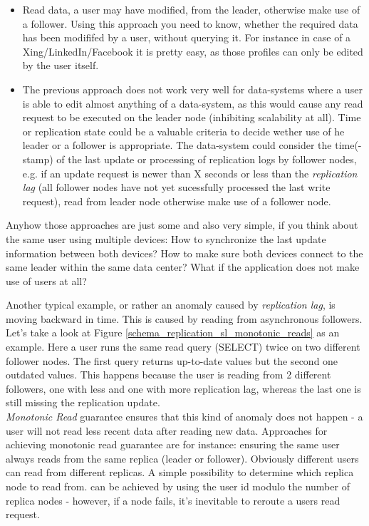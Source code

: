 {\begin{samepage}
\begin{itemize}
\item Read data, a user may have modified, from the leader, otherwise make use of a follower. Using this approach you need to know, whether the required data has been modififed by a user, without querying it. For instance in case of a Xing/LinkedIn/Facebook it is pretty easy, as those profiles can only be edited by the user itself.
\item The previous approach does not work very well for data-systems where a user is able to edit almost anything of a data-system, as this would cause any read request to be executed on the leader node (inhibiting scalability at all). Time or replication state could be a valuable criteria to decide wether use of he leader or a follower is appropriate. The data-system could consider the time(-stamp) of the last update or processing of replication logs by follower nodes, e.g. if an update request is newer than X seconds or less than the \textit{replication lag} (all follower nodes have not yet sucessfully processed the last write request), read from leader node otherwise make use of a follower node.\\
\end{itemize}
\end{samepage}
Anyhow those approaches are just some and also very simple, if you think about the same user using multiple devices: How to synchronize the last update information between both devices? How to make sure both devices connect to the same leader within the same data center? What if the application does not make use of users at all?

Another typical example, or rather an anomaly caused by \textit{replication lag}, is moving backward in time. This is caused by reading from asynchronous followers. Let's take a look at Figure \ref{schema_replication_sl_monotonic_reads} as an example. Here a user runs the same read query (SELECT) twice on two different follower nodes. The first query returns up-to-date values but the second one outdated values. This happens because the user is reading from 2 different followers, one with less and one with more replication lag, whereas the last one is still missing the replication update.\\
\textit{Monotonic Read} guarantee ensures that this kind of anomaly does not happen - a user will not read less recent data after reading new data. Approaches for achieving monotonic read guarantee are for instance: ensuring the same user always reads from the same replica (leader or follower). Obviously different users can read from different replicas. A simple possibility to determine which replica node to read from. can be achieved by using the user id modulo the number of replica nodes - however, if a node fails, it's inevitable to reroute a users read request.\\

}
